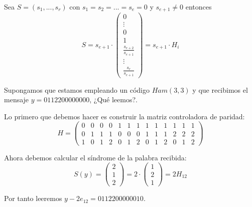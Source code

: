 \obs Sea $S=(s_1,...,s_r)$ con $s_1=s_2=...=s_e=0$ y $s_{e+1} \neq 0$ entonces
\[S = s_{e+1}\cdot \left( \begin{array}{c} 0 \\ \vdots \\ 0 \\ 1 \\ \frac{s_{e+2}}{s_{e+1}} \\ \vdots \\ \frac{s_{r}}{s_{e+1}}\end{array}\right)=s_{e+1}\cdot H_i\]

\begin{example}
Supongamos que estamos empleando un código $Ham(3,3)$ y que recibimos el mensaje $y=0112200000000$, ¿Qué leemos?.

Lo primero que debemos hacer es construir la matriz controladora de paridad:
\[H = \left(\begin{array}{ccccccccccccc}
0 & 0 & 0 & 0 & 1 & 1 & 1 & 1 & 1 & 1 & 1 & 1 & 1\\
0 & 1 & 1 & 1 & 0 & 0 & 0 & 1 & 1 & 1 & 2 & 2 & 2\\
1 & 0 & 1 & 2 & 0 & 1 & 2 & 0 & 1 & 2 & 0 & 1 & 2
\end{array}\right)\]

Ahora debemos calcular el síndrome de la palabra recibida:
\[S(y) = \left(\begin{array}{c} 2 \\ 1 \\ 2\end{array} \right) = 2 \cdot  \left(\begin{array}{c} 1 \\ 2 \\ 1\end{array} \right) = 2H_{12}\]

Por tanto leeremos $y-2e_{12}=0112200000010$.
\end{example}

